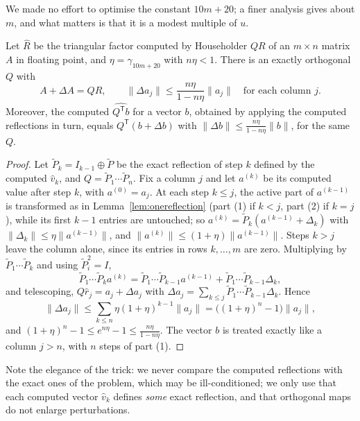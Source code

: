 We made no effort to optimise the constant $10m+20$; a finer analysis gives about $m$, and what matters is that it is a modest multiple of $u$.

\begin{theorem}\label{thm:qrstable}
Let $\hat R$ be the triangular factor computed by Householder $QR$ of an $m\times n$ matrix $A$ in floating point, and $\eta=\gamma_{10m+20}$ with
$n\eta<1$. There is an exactly orthogonal $Q$ with
\[
A+\Delta A=Q\hat R,\qquad\|\Delta a_j\|\le\frac{n\eta}{1-n\eta}\|a_j\|\quad\text{for each column }j.
\]
Moreover, the computed $\widehat{Q^{\mathsf T}b}$ for a vector $b$, obtained by applying the computed reflections in turn, equals $Q^{\mathsf T}(b+\Delta b)$ with
$\|\Delta b\|\le\frac{n\eta}{1-n\eta}\|b\|$, for the same $Q$.
\end{theorem}
\begin{proof}
Let $\tilde P_k=I_{k-1}\oplus\tilde P$ be the exact reflection of step $k$ defined by the computed $\hat v_k$, and $Q=\tilde P_1\cdots\tilde P_n$. Fix a column
$j$ and let $a^{(k)}$ be its computed value after step $k$, with $a^{(0)}=a_j$. At each step $k\le j$, the active part of $a^{(k-1)}$ is transformed as in
Lemma~\ref{lem:onereflection} (part (1) if $k<j$, part (2) if $k=j$), while its first $k-1$ entries are untouched; so
$a^{(k)}=\tilde P_k(a^{(k-1)}+\Delta_k)$ with $\|\Delta_k\|\le\eta\|a^{(k-1)}\|$, and $\|a^{(k)}\|\le(1+\eta)\|a^{(k-1)}\|$. Steps $k>j$ leave the column alone,
since its entries in rows $k,\dots,m$ are zero. Multiplying by $\tilde P_1\cdots\tilde P_k$ and using $\tilde P_i^2=I$,
\[
\tilde P_1\cdots\tilde P_ka^{(k)}=\tilde P_1\cdots\tilde P_{k-1}a^{(k-1)}+\tilde P_1\cdots\tilde P_{k-1}\Delta_k,
\]
and telescoping, $Q\hat r_j=a_j+\Delta a_j$ with $\Delta a_j=\sum_{k\le j}\tilde P_1\cdots\tilde P_{k-1}\Delta_k$. Hence
\[
\|\Delta a_j\|\le\sum_{k\le n}\eta(1+\eta)^{k-1}\|a_j\|=\bigl((1+\eta)^n-1\bigr)\|a_j\|,
\]
and $(1+\eta)^n-1\le e^{n\eta}-1\le\frac{n\eta}{1-n\eta}$. The vector $b$ is
treated exactly like a column $j>n$, with $n$ steps of part (1).
\end{proof}

Note the elegance of the trick: we never compare the computed reflections with the exact ones of the problem, which may be ill-conditioned; we only use
that each computed vector $\hat v_k$ defines \emph{some} exact reflection, and that orthogonal maps do not enlarge perturbations.

